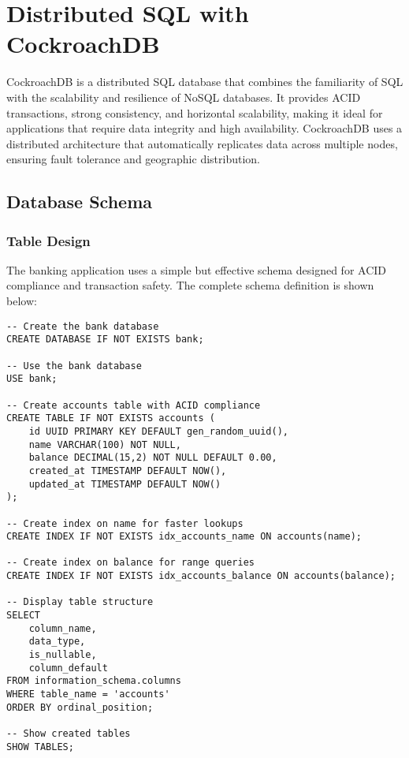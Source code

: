 \chapter{Distributed SQL with CockroachDB}

CockroachDB is a distributed SQL database that combines the familiarity of SQL with the scalability and resilience of NoSQL databases. It provides ACID transactions, strong consistency, and horizontal scalability, making it ideal for applications that require data integrity and high availability. CockroachDB uses a distributed architecture that automatically replicates data across multiple nodes, ensuring fault tolerance and geographic distribution.

\section{Database Schema}

\subsection{Table Design}
The banking application uses a simple but effective schema designed for ACID compliance and transaction safety. The complete schema definition is shown below:

\begin{verbatim}
-- Create the bank database
CREATE DATABASE IF NOT EXISTS bank;

-- Use the bank database
USE bank;

-- Create accounts table with ACID compliance
CREATE TABLE IF NOT EXISTS accounts (
    id UUID PRIMARY KEY DEFAULT gen_random_uuid(),
    name VARCHAR(100) NOT NULL,
    balance DECIMAL(15,2) NOT NULL DEFAULT 0.00,
    created_at TIMESTAMP DEFAULT NOW(),
    updated_at TIMESTAMP DEFAULT NOW()
);

-- Create index on name for faster lookups
CREATE INDEX IF NOT EXISTS idx_accounts_name ON accounts(name);

-- Create index on balance for range queries
CREATE INDEX IF NOT EXISTS idx_accounts_balance ON accounts(balance);

-- Display table structure
SELECT
    column_name,
    data_type,
    is_nullable,
    column_default
FROM information_schema.columns
WHERE table_name = 'accounts'
ORDER BY ordinal_position;

-- Show created tables
SHOW TABLES;
\end{verbatim}


